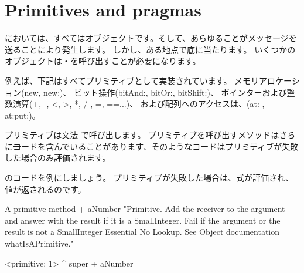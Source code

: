 \documentclass[a4paper,10pt,twoside]{book}
\begin{document}
\section{Primitives and pragmas}

\st においては、すべてはオブジェクトです。そして、あらゆることがメッセージを送ることにより発生します。
しかし、ある地点で底に当たります。
いくつかのオブジェクトは・を呼び出すことが必要になります。

例えば、下記はすべてプリミティブとして実装されています。
メモリアロケーション(new, new:)、
ビット操作(bitAnd:, bitOr:, bitShift:)、
ポインターおよび整数演算(+, -, <, >, *, / , =, ==...)、
および配列へのアクセスは、(at: , at:put:)。

プリミティブは文法 で呼び出します。
プリミティブを呼び出すメソッドはさらに\st コードを含んでいることがあります、そのようなコードはプリミティブが失敗した場合のみ評価されます。

のコードを例にしましょう。
プリミティブが失敗した場合は、式が評価され、値が返されるのです。

\begin{method}[primitive]{A primitive method}
+ aNumber 
  "Primitive. Add the receiver to the argument and answer with the result
  if it is a SmallInteger. Fail if the argument or the result is not a
  SmallInteger  Essential  No Lookup. See Object documentation whatIsAPrimitive."

  <primitive: 1>
  ^ super + aNumber
\end{method}


\end{document}
